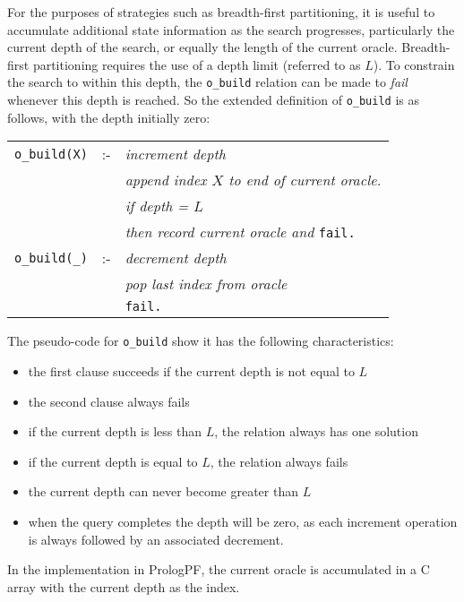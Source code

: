 For the purposes of strategies such as breadth-first partitioning, it is useful to
accumulate additional state information as the search progresses, particularly the
current depth of the search, or equally the length of the current oracle.  Breadth-first
partitioning requires the use of a depth limit (referred to as $L$).  To constrain the
search to within this depth, the \texttt{o\_{}build} relation can be made to \textit{fail}
whenever this depth is reached.  So the extended definition of \texttt{o\_{}build} is as
follows, with the depth initially zero:

\begin{tabular}{l l l}
\texttt{o\_{}build(X)}    & :- & \textit{increment depth}\\
                          &    & \textit{append index $X$ to end of current oracle.}\\
                          &    & \textit{if depth = $L$}\\
                          &    & \textit{then record current oracle and }\texttt{fail.}\\
\texttt{o\_{}build(\_{})} & :- & \textit{decrement depth}\\
                          &    & \textit{pop last index from oracle}\\
                          &    & \texttt{fail.}\\
\end{tabular}

The pseudo-code for \texttt{o\_{}build} show it has the following characteristics:
\begin{itemize}
\item{the first clause succeeds if the current depth is not equal to $L$}
\item{the second clause always fails}
\item{if the current depth is less than $L$, the relation always has one solution}
\item{if the current depth is equal to $L$, the relation always fails}
\item{the current depth can never become greater than $L$}
\item{when the query completes the depth will be zero, as each increment operation is
  always followed by an associated decrement.}
\end{itemize}

In the implementation in PrologPF, the current oracle is accumulated in a C array with
the current depth as the index.

